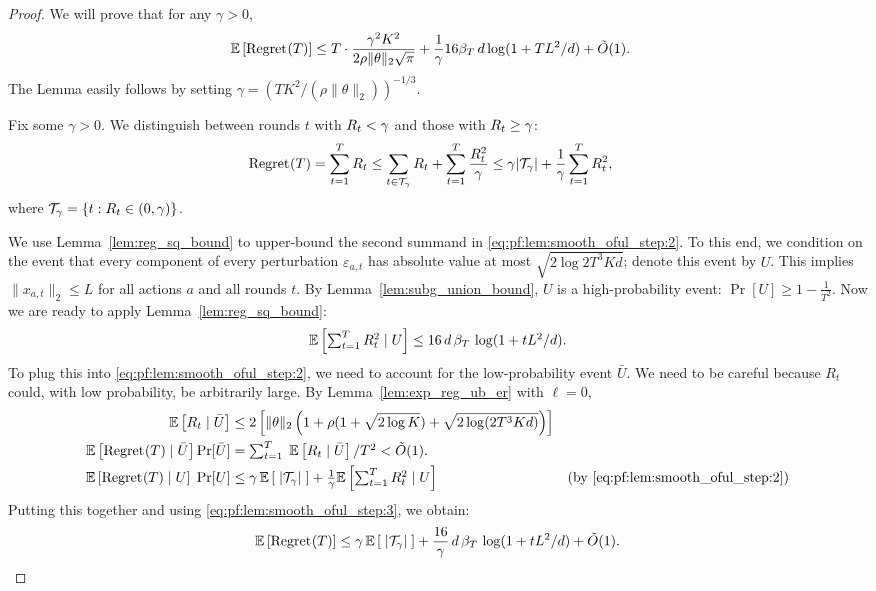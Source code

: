 \begin{proof}
We will prove that for any $\gamma > 0$,
  \begin{align}\label{eq:pf:lem:smooth_oful_step}
    \mathbb{E}\left[\text{Regret}^{}(T)\right]
    &\le T \cdot \frac{\gamma^2
    K^2}{2\rho\|\theta\|_2\sqrt{\pi}} + \frac{1}{\gamma} 16 \beta_T\, d
    \log(1 + TL^2/d) + \tilde O(1).
  \end{align}
The Lemma easily follows by setting $\gamma = (TK^2/(\rho \|\theta\|_2))^{-1/3}$.

Fix some $\gamma>0$. We distinguish
between rounds $t$ with $R_{t}<\gamma $ and those with $R_{t}\geq \gamma$:
\begin{align}\label{eq:pf:lem:smooth_oful_step:2}
  \text{Regret}^{}(T) &= \sum_{t=1}^T R_{t}
  \le \sum_{t \in \mathcal{T}_\gamma} R_{t} + \sum_{t=1}^T
  \frac{R_{t}^2}{\gamma}
  \le \gamma |\mathcal{T}_\gamma| + \frac{1}{\gamma} \sum_{t=1}^T R_{t}^2,
\end{align}
where $\mathcal{T}_\gamma = \{t : R_{t} \in (0, \gamma)\}$.

We use Lemma~\ref{lem:reg_sq_bound} to upper-bound the second summand in \eqref{eq:pf:lem:smooth_oful_step:2}. To this end, we condition on the event that every
component of every perturbation $\varepsilon_{a, t}$ has absolute value at most $\sqrt{2 \log{2T^3
Kd}}$; denote this event by $U$. This implies $\|x_{a,t}\|_2 \le L$ for all
actions $a$ and all rounds $t$. By Lemma~\ref{lem:subg_union_bound}, $U$ is a high-probability event:
    $\Pr[U] \ge 1 - \frac{1}{T^2}$.
Now we are ready to apply Lemma~\ref{lem:reg_sq_bound}:
\begin{align}\label{eq:pf:lem:smooth_oful_step:3}
\textstyle \mathbb{E}\left[\sum_{t=1}^T R_{t}^2 \;|\; U\right]
    \leq 16\,d\,\beta_T \,\log(1+tL^2/d).
\end{align}
To plug this into \eqref{eq:pf:lem:smooth_oful_step:2}, we need to account for the low-probability event $\bar{U}$. We need to be careful because $R_t$ could, with low probability, be arbitrarily large. By Lemma~\ref{lem:exp_reg_ub_er} with $\ell = 0$,
\begin{align*}
\mathbb{E}\left[R_t \;|\; \bar U\right]
    &\le 2\left[\|\theta\|_2 \left(1 + \rho(1+ \sqrt{2 \log K}) + \sqrt{2 \log(2T^3 Kd)}\right)\right] \\
\mathbb{E}\left[\text{Regret}^{}(T) \;|\; \bar U\right] \Pr[\bar U]
&= \textstyle \sum_{t=1}^T\;\mathbb{E}\left[R_t \;|\; \bar U\right] /T^2 < \tilde O(1). \\
\mathbb{E}\left[\text{Regret}^{}(T) \;|\; U\right]\; \Pr[U]
    &\leq \textstyle \gamma\, \mathbb{E}\left[\;|\mathcal{T}_\gamma|\;\right]
        + \frac{1}{\gamma} \mathbb{E}\left[\sum_{t=1}^T R_{t}^2 \;|\; U\right]
            &\text{(by \eqref{eq:pf:lem:smooth_oful_step:2})}
\end{align*}
Putting this together and using \eqref{eq:pf:lem:smooth_oful_step:3}, we obtain:
\begin{align}\label{eq:pf:lem:smooth_oful_step:4}
\mathbb{E}\left[\text{Regret}^{}(T)\right]
    \leq
        \gamma\, \mathbb{E}\left[\;|\mathcal{T}_\gamma|\;\right]
        + \frac{16}{\gamma}\,d\,\beta_T \,\log(1+tL^2/d)+ \tilde O(1).
\end{align}


\end{proof}
